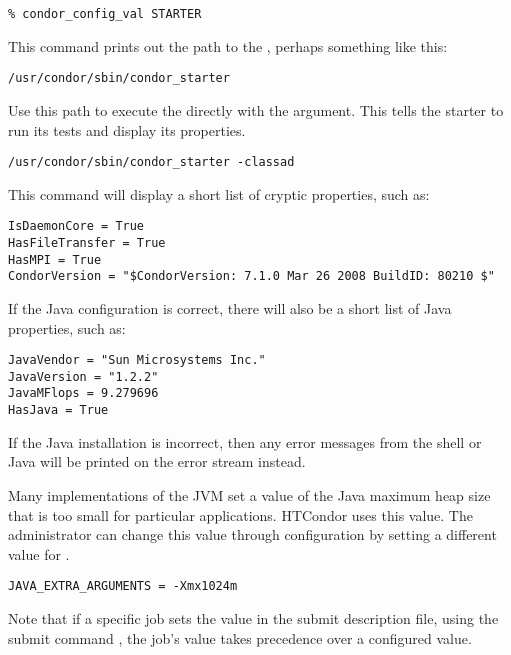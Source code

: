 \begin{verbatim}
% condor_config_val STARTER
\end{verbatim}

This command prints out the path to the ,
perhaps something like this:

\begin{verbatim}
/usr/condor/sbin/condor_starter
\end{verbatim}

Use this path to execute the  directly
with the  argument.
This tells the starter to run its tests and display its properties.

\begin{verbatim}
/usr/condor/sbin/condor_starter -classad
\end{verbatim}

This command will display a short list of cryptic properties, such as:

\begin{verbatim}
IsDaemonCore = True
HasFileTransfer = True
HasMPI = True
CondorVersion = "$CondorVersion: 7.1.0 Mar 26 2008 BuildID: 80210 $"
\end{verbatim}

If the Java configuration is correct, there will also
be a short list of Java properties, such as:

\begin{verbatim}
JavaVendor = "Sun Microsystems Inc."
JavaVersion = "1.2.2"
JavaMFlops = 9.279696
HasJava = True
\end{verbatim}

If the Java installation is incorrect, then any error
messages from the shell or Java will be printed
on the error stream instead.

Many implementations of the JVM set a value of the Java maximum heap size
that is too small for particular applications.
HTCondor uses this value.
The administrator can change this value through configuration by setting
a different value for .

\footnotesize
\begin{verbatim}
JAVA_EXTRA_ARGUMENTS = -Xmx1024m
\end{verbatim}
\normalsize
Note that if a specific job sets the value in the submit description
file, using the submit command ,
the job's value takes precedence over a configured value.


